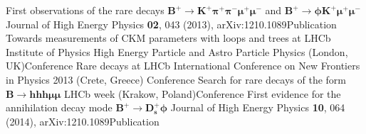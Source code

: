{First observations of the rare decays
  $\boldsymbol{B^+\!\to K^+\pi^+\pi^-\mu^+\mu^-}$ and
  $\boldsymbol{B^+\!\to\phi K^+\mu^+\mu^-}$}
  {Journal of High Energy Physics \textbf{02}, 043 (2013), arXiv:1210.1089}{Publication}
{Towards measurements of CKM parameters with loops and trees at LHCb}
{Institute of Physics High Energy Particle and Astro Particle
Physics (London, UK)}{Conference}
{Rare decays at LHCb}
{International Conference on New Frontiers in Physics 2013 (Crete, Greece)}
{Conference}
{Search for rare decays of the form $\boldsymbol{B\to hhh\mu\mu}$}
{LHCb week (Krakow, Poland)}{Conference}
{First evidence for the annihilation decay mode $\boldsymbol{B^+\!\to D_s^+\phi}$}
{Journal of High Energy Physics \textbf{10}, 064 (2014), arXiv:1210.1089}{Publication}







